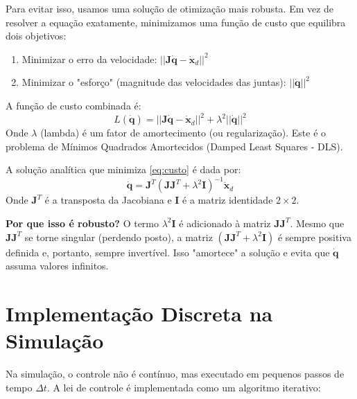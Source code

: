 \documentclass[a4paper, 12pt]{article}
\begin{document}
Para evitar isso, usamos uma solução de otimização mais robusta. Em vez de resolver a equação exatamente, minimizamos uma função de custo que equilibra dois objetivos:
\begin{enumerate}
    \item Minimizar o erro da velocidade: $|| \mathbf{J}\dot{\mathbf{q}} - \dot{\mathbf{x}}_d ||^2$
    \item Minimizar o "esforço" (magnitude das velocidades das juntas): $||\dot{\mathbf{q}}||^2$
\end{enumerate}
A função de custo combinada é:
\begin{equation}
L(\dot{\mathbf{q}}) = || \mathbf{J}\dot{\mathbf{q}} - \dot{\mathbf{x}}_d ||^2 + \lambda^2 ||\dot{\mathbf{q}}||^2
\label{eq:custo}
\end{equation}
Onde $\lambda$ (lambda) é um fator de amortecimento (ou regularização). Este é o problema de Mínimos Quadrados Amortecidos (Damped Least Squares - DLS).

A solução analítica que minimiza \eqref{eq:custo} é dada por:
\begin{equation}
\dot{\mathbf{q}} = \mathbf{J}^T (\mathbf{J} \mathbf{J}^T + \lambda^2 \mathbf{I})^{-1} \dot{\mathbf{x}}_d
\label{eq:dls_sol}
\end{equation}
Onde $\mathbf{J}^T$ é a transposta da Jacobiana e $\mathbf{I}$ é a matriz identidade $2 \times 2$.

\textbf{Por que isso é robusto?} O termo $\lambda^2 \mathbf{I}$ é adicionado à matriz $\mathbf{J} \mathbf{J}^T$. Mesmo que $\mathbf{J} \mathbf{J}^T$ se torne singular (perdendo posto), a matriz $(\mathbf{J} \mathbf{J}^T + \lambda^2 \mathbf{I})$ é sempre positiva definida e, portanto, sempre invertível. Isso "amortece" a solução e evita que $\dot{\mathbf{q}}$ assuma valores infinitos.

\section{Implementação Discreta na Simulação}
Na simulação, o controle não é contínuo, mas executado em pequenos passos de tempo $\Delta t$. A lei de controle é implementada como um algoritmo iterativo:
\end{document}
